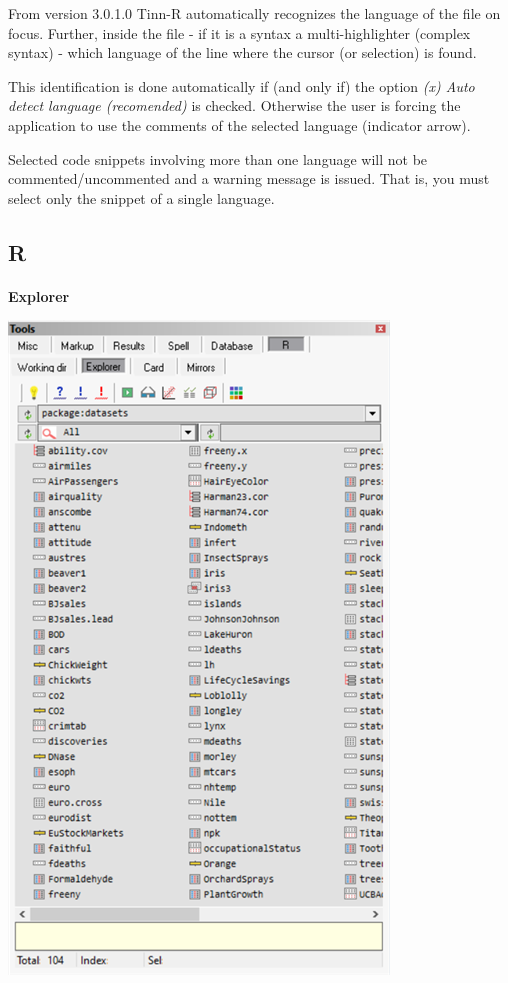 From version 3.0.1.0 Tinn-R automatically recognizes the
language of the file on focus. Further, inside the file
- if it is a syntax a multi-highlighter (complex syntax) - which language of
the line where the cursor (or selection) is found.

This identification is done automatically if (and only if) the option
\textit{(x) Auto detect language (recomended)} is checked. Otherwise
the user is forcing the application to use the comments of the selected language
(indicator arrow).

Selected code snippets involving more than one language will not be commented/uncommented
and a warning message is issued. That is, you must select only the snippet of a single language.

\newpage
\subsection{R}

\paragraph{}\textbf{Explorer}\\

\includegraphics[scale=0.50]{./res/tools_r_explorer.png} \\

